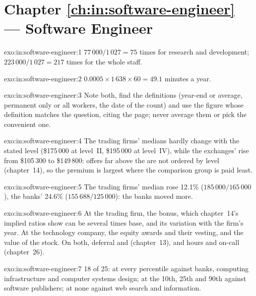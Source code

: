 \section*{Chapter \ref{ch:in:software-engineer} --- Software Engineer}

\begin{solution}{exo:in:software-engineer:1}
$77\,000/1\,027=75$ times for research and development; $223\,000/1\,027=217$ times for the whole staff.
\end{solution}

\begin{solution}{exo:in:software-engineer:2}
$0.0005\times1\,638\times60=49.1$ minutes a year.
\end{solution}

\begin{solution}{exo:in:software-engineer:3}
Note both, find the definitions (year-end or average, permanent only or all workers, the date of the count) and use the
figure whose definition matches the question, citing the page; never average them or pick the convenient one.
\end{solution}

\begin{solution}{exo:in:software-engineer:4}
The trading firms' medians hardly change with the stated level (\$175\,000 at level~II, \$195\,000 at level~IV), while the
exchanges' rise from \$105\,300 to \$149\,800: offers far above the  are not ordered by level
(chapter~14), so the premium is largest where the comparison group is paid least.
\end{solution}

\begin{solution}{exo:in:software-engineer:5}
The trading firms' median rose 12.1\% ($185\,000/165\,000$), the banks' 24.6\% ($155\,688/125\,000$): the banks moved
more.
\end{solution}

\begin{solution}{exo:in:software-engineer:6}
At the trading firm, the bonus, which chapter~14's implied ratios show can be several times base, and its variation with
the firm's year. At the technology company, the equity awards and their vesting, and the value of the stock. On both,
deferral and  (chapter~13), and hours and on-call (chapter~26).
\end{solution}

\begin{solution}{exo:in:software-engineer:7}
18 of 25: at every percentile against banks, computing infrastructure and computer systems design; at the 10th, 25th and
90th against software publishers; at none against web search and information.
\end{solution}

